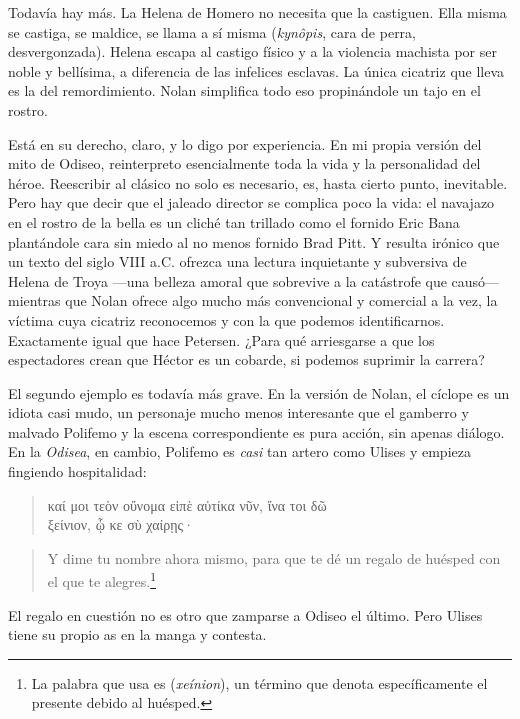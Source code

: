 Todavía hay más. La Helena de Homero no necesita que la castiguen. Ella misma se castiga, se maldice, se llama a sí misma  (\emph{kynôpis}, cara de perra, desvergonzada). Helena escapa al castigo físico y a la violencia machista por ser noble y bellísima, a diferencia de las infelices esclavas. La única cicatriz que lleva es la del remordimiento. Nolan simplifica todo eso propinándole un tajo en el rostro.

Está en su derecho, claro, y lo digo por experiencia. En mi propia versión del mito de Odiseo, reinterpreto esencialmente toda la vida y la personalidad del héroe. Reescribir al clásico no solo es necesario, es, hasta cierto punto, inevitable. Pero hay que decir que el jaleado director se complica poco la vida: el navajazo en el rostro de la bella es un cliché tan trillado como el fornido Eric Bana plantándole cara sin miedo al no menos fornido Brad Pitt. Y resulta irónico que un texto del siglo VIII a.C. ofrezca una lectura inquietante y subversiva de Helena de Troya ---una belleza amoral que sobrevive a la catástrofe que causó--- mientras que Nolan ofrece algo mucho más convencional y comercial a la vez, la víctima cuya cicatriz reconocemos y con la que podemos identificarnos. Exactamente igual que hace Petersen. ¿Para qué arriesgarse a que los espectadores crean que Héctor es un cobarde, si podemos suprimir la carrera? 

El segundo ejemplo es todavía más grave. En la versión de Nolan, el cíclope es un idiota casi mudo, un personaje mucho menos interesante que el gamberro y malvado Polifemo y la escena correspondiente es pura acción, sin apenas diálogo. En la \emph{Odisea}, en cambio, Polifemo es \emph{casi} tan artero como Ulises y empieza fingiendo hospitalidad:

\begin{verse}
\foreignlanguage{greek}{καί μοι τεὸν οὔνομα εἰπὲ αὐτίκα νῦν, ἵνα τοι δῶ\\
ξείνιον, ᾧ κε σὺ χαίρῃς·}
\end{verse}

\begin{verse}
Y dime tu nombre ahora mismo, para que te dé un regalo de huésped con el que te alegres.\footnote{La palabra que usa es  (\emph{xeínion}), un término que denota específicamente el presente debido al huésped.}
\end{verse}

El regalo en cuestión no es otro que zamparse a Odiseo el último. Pero Ulises tiene su propio as en la manga y contesta.

